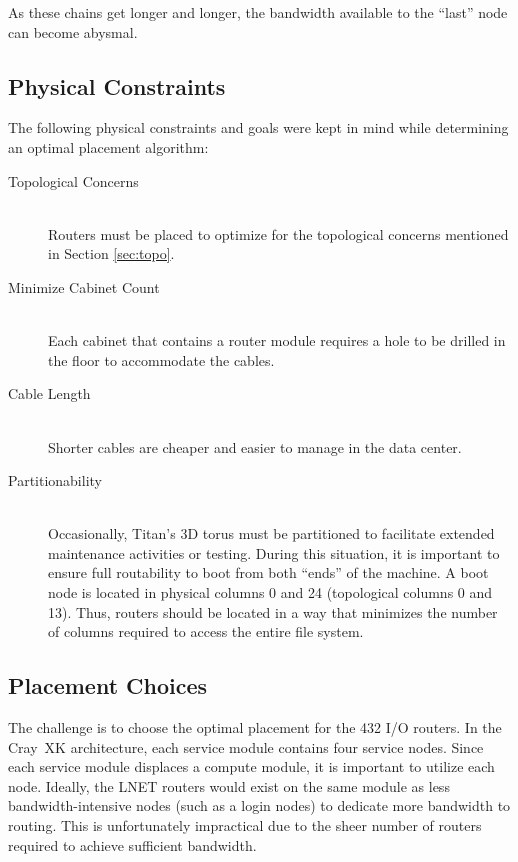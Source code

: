 As these chains get longer and longer, the bandwidth available to the ``last''
node can become abysmal.

\subsection{Physical Constraints}


The following physical constraints and goals were kept in mind while
determining an optimal placement algorithm:

\begin{description}
  \item[Topological Concerns] \hfill \\
    Routers must be placed to optimize for the topological concerns mentioned
    in Section \ref{sec:topo}.
  \item[Minimize Cabinet Count] \hfill \\
    Each cabinet that contains a router module requires a hole to be drilled in
    the floor to accommodate the cables.
  \item[Cable Length] \hfill \\
    Shorter cables are cheaper and easier to manage in the data center.
  \item[Partitionability] \hfill \\
    Occasionally, Titan's 3D torus must be partitioned to facilitate extended
    maintenance activities or testing.  During this situation, it is important to
    ensure full routability to boot from both ``ends'' of the machine.  A boot
    node is located in physical columns 0 and 24 (topological columns 0 and 13).
    Thus, routers should be located in a way that minimizes the number of
    columns required to access the entire file system.
\end{description}

\subsection{Placement Choices}

The challenge is to choose the optimal placement for the 432 I/O routers. In
the Cray~XK architecture, each service module contains four service nodes.
Since each service module displaces a compute module, it is important to
utilize each node.  Ideally, the LNET routers would exist on the same module as
less bandwidth-intensive nodes (such as a login nodes) to dedicate more
bandwidth to routing.  This is unfortunately impractical due to the sheer number
of routers required to achieve sufficient bandwidth.


